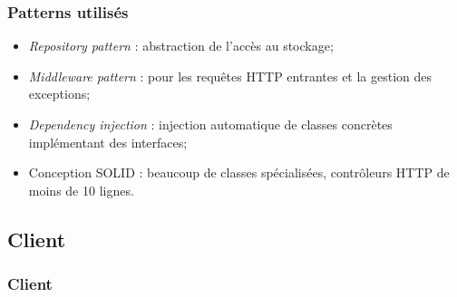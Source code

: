 	\begin{frame}
		\frametitle{Patterns utilisés}
		\begin{itemize}
			\item \textit{Repository pattern} : abstraction de l'accès au stockage;
			\item \textit{Middleware pattern} : pour les requêtes HTTP entrantes et la gestion des exceptions;
			\item \textit{Dependency injection} : injection automatique de classes concrètes implémentant des interfaces;
			\item Conception SOLID : beaucoup de classes spécialisées, contrôleurs HTTP de moins de 10 lignes.
		\end{itemize}
	\end{frame}

\subsection{Client}
	\begin{frame}
		\frametitle{Client}
	\end{frame}
